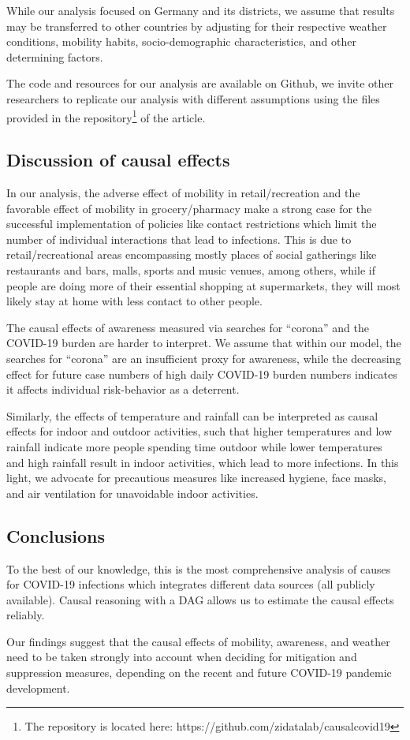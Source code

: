 \documentclass[]{elsarticle} %
\begin{document}
While our analysis focused on Germany and its districts, we assume that
results may be transferred to other countries by adjusting for their
respective weather conditions, mobility habits, socio-demographic
characteristics, and other determining factors.

The code and resources for our analysis are available on Github, we
invite other researchers to replicate our analysis with different
assumptions using the files provided in the repository\footnote{The
  repository is located here: https://github.com/zidatalab/causalcovid19}
of the article.

\subsection{Discussion of causal
effects}\label{discussion-of-causal-effects}

In our analysis, the adverse effect of mobility in retail/recreation and
the favorable effect of mobility in grocery/pharmacy make a strong case
for the successful implementation of policies like contact restrictions
which limit the number of individual interactions that lead to
infections. This is due to retail/recreational areas encompassing mostly
places of social gatherings like restaurants and bars, malls, sports and
music venues, among others, while if people are doing more of their
essential shopping at supermarkets, they will most likely stay at home
with less contact to other people.

The causal effects of awareness measured via searches for ``corona'' and
the COVID-19 burden are harder to interpret. We assume that within our
model, the searches for ``corona'' are an insufficient proxy for
awareness, while the decreasing effect for future case numbers of high
daily COVID-19 burden numbers indicates it affects individual
risk-behavior as a deterrent.

Similarly, the effects of temperature and rainfall can be interpreted as
causal effects for indoor and outdoor activities, such that higher
temperatures and low rainfall indicate more people spending time outdoor
while lower temperatures and high rainfall result in indoor activities,
which lead to more infections. In this light, we advocate for
precautious measures like increased hygiene, face masks, and air
ventilation for unavoidable indoor activities.

\subsection{Conclusions}\label{conclusions}

To the best of our knowledge, this is the most comprehensive analysis of
causes for COVID-19 infections which integrates different data sources
(all publicly available). Causal reasoning with a DAG allows us to
estimate the causal effects reliably.

Our findings suggest that the causal effects of mobility, awareness, and
weather need to be taken strongly into account when deciding for
mitigation and suppression measures, depending on the recent and future
COVID-19 pandemic development.

\renewcommand\refname{References}

\end{document}
